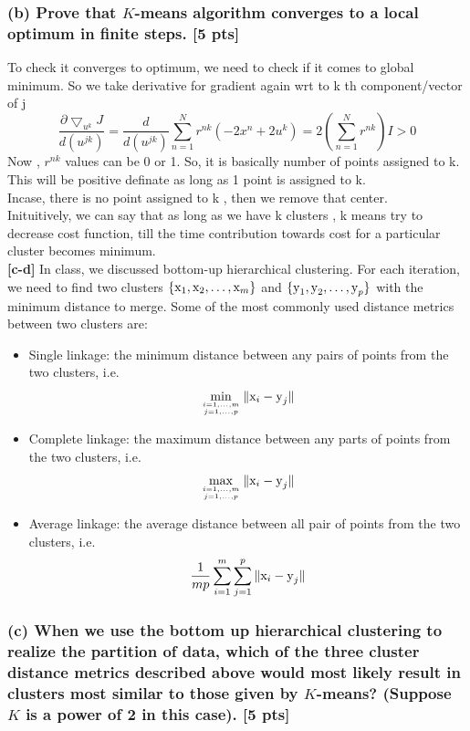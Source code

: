 \documentclass[twoside,10pt]{article}
\begin{document}
\subsubsection*{(b) Prove that $K$-means algorithm converges to a local optimum in finite steps. [5 pts]}
To check it converges to optimum, we need to check if it comes to global minimum. So we take derivative for gradient again wrt to k th component/vector of j
$$ \frac{ \partial{  \bigtriangledown_{u^k}J}}{d(u^{jk})} = \frac{d }{d(u^{jk})}\sum_{n=1}^N r^{nk}(-2x^n + 2 u^k) =2({\sum_{n=1}^N r^{nk}})I >0$$
 Now , $r^{nk}$ values can be 0 or 1. So, it is basically number of points assigned to k. This will be positive definate as long as 1 point is assigned to k. \\ Incase, there is no point assigned to k , then we remove that center. \\[.55cm]

Inituitively, we can say that as long as we have k clusters , k means try to decrease cost function, till the time contribution towards cost for a particular cluster becomes minimum. \\[.25cm]
\textbf{[c-d]} In class, we discussed bottom-up hierarchical clustering. For each iteration, we need to find two clusters $\{\text x_1, \text x_2, \dots, \text x_m\}$ and $\{\text y_1, \text y_2, \dots, \text y_p\}$ with the minimum distance to merge. Some of the most commonly used distance metrics between two clusters are:
    \begin{itemize}
    \item Single linkage: the minimum distance between any pairs of points from the two clusters, i.e.
    $$\min_{i=1,\dots,m \atop j=1,\dots, p}\|\text x_i - \text y_j\|$$
    \item Complete linkage: the maximum distance between any parts of points from the two clusters, i.e.
    $$\max_{i=1,\dots,m \atop j=1,\dots, p}\|\text x_i - \text y_j\|$$
    \item Average linkage: the average distance between all pair of points from the two clusters, i.e.
    $$\frac{1}{mp}\sum_{i=1}^m\sum_{j=1}^p\|\text x_i - \text y_j\|$$
    \end{itemize}

\subsubsection*{(c) When we use the bottom up hierarchical clustering to realize the partition of data, which of the three cluster distance metrics described above would most likely result in clusters most similar to those given by $K$-means? (Suppose $K$ is a power of 2 in this case). [5 pts]}
\end{document}

